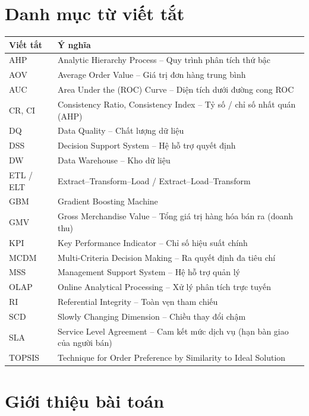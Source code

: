 \documentclass[a4paper]{article}
\newcommand{\thead}[1]{\textbf{#1}}
\begin{document}
\section*{Danh mục từ viết tắt}
\begin{table}[!htbp]
\centering
\small
\begin{tabularx}{\textwidth}{@{}l Y@{}}
\toprule
\thead{Viết tắt} & \thead{Ý nghĩa} \\
\midrule
AHP & Analytic Hierarchy Process -- Quy trình phân tích thứ bậc \\
AOV & Average Order Value -- Giá trị đơn hàng trung bình \\
AUC & Area Under the (ROC) Curve -- Diện tích dưới đường cong ROC \\
CR, CI & Consistency Ratio, Consistency Index -- Tỷ số / chỉ số nhất quán (AHP) \\
DQ & Data Quality -- Chất lượng dữ liệu \\
DSS & Decision Support System -- Hệ hỗ trợ quyết định \\
DW & Data Warehouse -- Kho dữ liệu \\
ETL / ELT & Extract--Transform--Load / Extract--Load--Transform \\
GBM & Gradient Boosting Machine \\
GMV & Gross Merchandise Value -- Tổng giá trị hàng hóa bán ra (doanh thu) \\
KPI & Key Performance Indicator -- Chỉ số hiệu suất chính \\
MCDM & Multi-Criteria Decision Making -- Ra quyết định đa tiêu chí \\
MSS & Management Support System -- Hệ hỗ trợ quản lý \\
OLAP & Online Analytical Processing -- Xử lý phân tích trực tuyến \\
RI & Referential Integrity -- Toàn vẹn tham chiếu \\
SCD & Slowly Changing Dimension -- Chiều thay đổi chậm \\
SLA & Service Level Agreement -- Cam kết mức dịch vụ (hạn bàn giao của người bán) \\
TOPSIS & Technique for Order Preference by Similarity to Ideal Solution \\
\bottomrule
\end{tabularx}
\end{table}
\newpage

\section{Giới thiệu bài toán}
\end{document}

